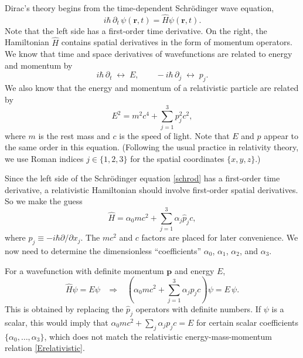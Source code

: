 \documentclass[pra,12pt]{revtex4}
\begin{document}
Dirac's theory begins from the time-dependent Schr\"odinger wave
equation,
\begin{equation}
  i\hbar\, \partial_t\, \psi(\mathbf{r},t)
  = \hat{H} \psi(\mathbf{r},t).
  \label{schrod}
\end{equation}
Note that the left side has a first-order time derivative.  On the
right, the Hamiltonian $\hat{H}$ contains spatial derivatives in the
form of momentum operators.  We know that time and space derivatives
of wavefunctions are related to energy and momentum by
\begin{equation}
    i\hbar\, \partial_t\; \leftrightarrow \;
    E, \qquad
    -i\hbar\, \partial_j \;\leftrightarrow \;
    p_j.
\end{equation}
We also know that the energy and momentum of a relativistic particle
are related by
\begin{equation}
  E^2 = m^2c^4 + \sum_{j=1}^3 p_j^2c^2,
  \label{Erelativistic}
\end{equation}
where $m$ is the rest mass and $c$ is the speed of light.  Note that
$E$ and $p$ appear to the same order in this equation.  (Following the
usual practice in relativity theory, we use Roman indices $j \in
\{1,2,3\}$ for the spatial coordinates $\{x,y,z\}$.)

Since the left side of the Schr\"odinger equation \eqref{schrod} has a
first-order time derivative, a relativistic Hamiltonian should involve
first-order spatial derivatives.  So we make the guess
\begin{equation}
  \hat{H} = \alpha_0 mc^2 + \sum_{j=1}^3 \alpha_j \hat{p}_j c,
  \label{Dirac0}
\end{equation}
where $\hat{p}_j \equiv -i\hbar \partial/\partial x_j$.  The $mc^2$
and $c$ factors are placed for later convenience.  We now need to
determine the dimensionless ``coefficients'' $\alpha_0$, $\alpha_1$,
$\alpha_2$, and $\alpha_3$.

For a wavefunction with definite momentum $\mathbf{p}$ and energy
$E$,
\begin{equation}
  \hat{H}\psi = E \psi \;\;\;\Rightarrow \;\;\;
  \left(\alpha_0mc^2 + \sum_{j=1}^3\alpha_j p_jc\right) \psi = E\,\psi.
\end{equation}
This is obtained by replacing the $\hat{p}_j$ operators with definite
numbers.  If $\psi$ is a scalar, this would imply that $\alpha_0 mc^2
+ \sum_{j}\alpha_j p_j c = E$ for certain scalar coefficients
$\{\alpha_0, \dots, \alpha_3\}$, which does not match the relativistic
energy-mass-momentum relation \eqref{Erelativistic}.
\end{document}
